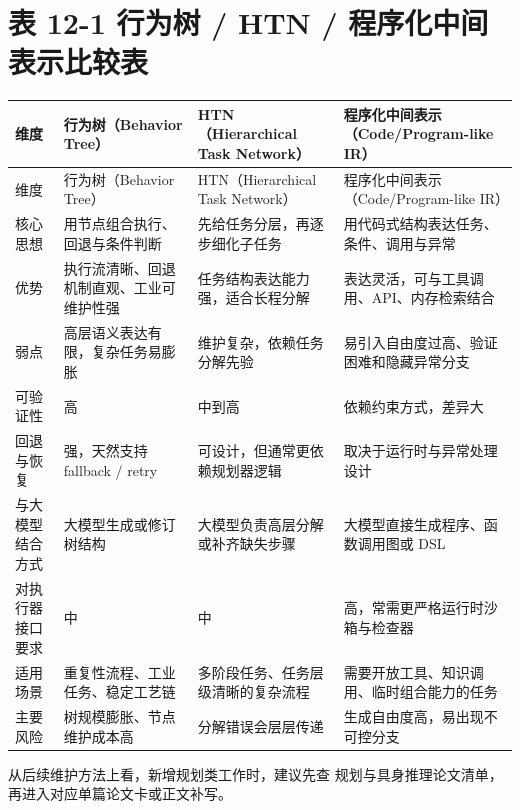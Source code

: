 \section*{表 12-1 行为树 / HTN / 程序化中间表示比较表}

\begingroup
\small
\begin{xltabular}{\textwidth}{YYYY}
\toprule
维度 & 行为树（Behavior Tree） & HTN（Hierarchical Task Network） & 程序化中间表示（Code/Program-like IR） \\
\midrule
\endfirsthead
\toprule
维度 & 行为树（Behavior Tree） & HTN（Hierarchical Task Network） & 程序化中间表示（Code/Program-like IR） \\
\midrule
\endhead
核心思想 & 用节点组合执行、回退与条件判断 & 先给任务分层，再逐步细化子任务 & 用代码式结构表达任务、条件、调用与异常 \\
优势 & 执行流清晰、回退机制直观、工业可维护性强 & 任务结构表达能力强，适合长程分解 & 表达灵活，可与工具调用、API、内存检索结合 \\
弱点 & 高层语义表达有限，复杂任务易膨胀 & 维护复杂，依赖任务分解先验 & 易引入自由度过高、验证困难和隐藏异常分支 \\
可验证性 & 高 & 中到高 & 依赖约束方式，差异大 \\
回退与恢复 & 强，天然支持 fallback / retry & 可设计，但通常更依赖规划器逻辑 & 取决于运行时与异常处理设计 \\
与大模型结合方式 & 大模型生成或修订树结构 & 大模型负责高层分解或补齐缺失步骤 & 大模型直接生成程序、函数调用图或 DSL \\
对执行器接口要求 & 中 & 中 & 高，常需更严格运行时沙箱与检查器 \\
适用场景 & 重复性流程、工业任务、稳定工艺链 & 多阶段任务、任务层级清晰的复杂流程 & 需要开放工具、知识调用、临时组合能力的任务 \\
主要风险 & 树规模膨胀、节点维护成本高 & 分解错误会层层传递 & 生成自由度高，易出现不可控分支 \\
\bottomrule
\end{xltabular}
\endgroup

从后续维护方法上看，新增规划类工作时，建议先查 规划与具身推理论文清单，再进入对应单篇论文卡或正文补写。
